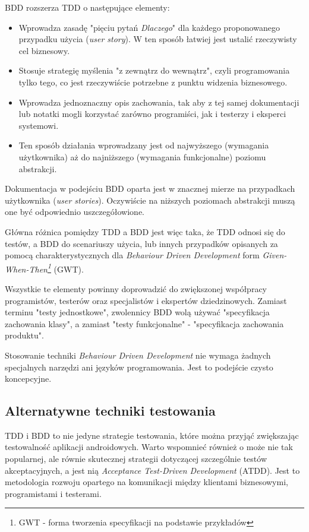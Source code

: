 BDD rozszerza TDD o następujące elementy:
\begin{itemize}
\item
Wprowadza zasadę "pięciu pytań \textit{Dlaczego}" dla każdego proponowanego przypadku użycia (\textit{user story}). W ten sposób łatwiej jest ustalić rzeczywisty cel biznesowy.

\item
Stosuje strategię myślenia "z zewnątrz do wewnątrz", czyli programowania tylko tego, co jest rzeczywiście potrzebne z punktu widzenia biznesowego.

\item
Wprowadza jednoznaczny opis zachowania, tak aby z tej samej dokumentacji lub notatki mogli korzystać zarówno programiści, jak i testerzy i eksperci systemowi.

\item
Ten sposób działania wprowadzany jest od najwyższego (wymagania użytkownika) aż do najniższego (wymagania funkcjonalne) poziomu abstrakcji.

\end{itemize}

Dokumentacja w podejściu BDD oparta jest w znacznej mierze na przypadkach użytkownika (\textit{user stories}). Oczywiście na niższych poziomach abstrakcji muszą one być odpowiednio uszczegółowione.

Główna różnica pomiędzy TDD a BDD jest więc taka, że TDD odnosi się do testów, a BDD do scenariuszy użycia, lub innych przypadków opisanych za pomocą charakterystycznych dla \textit{Behaviour Driven Development} form \textit{Given-When-Then\footnote{GWT - forma tworzenia specyfikacji na podstawie przykładów}} (GWT).

Wszystkie te elementy powinny doprowadzić do zwiększonej współpracy programistów, testerów oraz specjalistów i ekspertów dziedzinowych. Zamiast terminu "testy jednostkowe", zwolennicy BDD wolą używać "specyfikacja zachowania klasy", a zamiast "testy funkcjonalne" - "specyfikacja zachowania produktu".

Stosowanie techniki \textit{Behaviour Driven Development} nie wymaga żadnych specjalnych narzędzi ani języków programowania. Jest to podejście czysto koncepcyjne.\cite{website:agile:guide}

\subsection{Alternatywne techniki testowania}
\label{alternatywne_metody_testowania}
TDD i BDD to nie jedyne strategie testowania, które można przyjąć zwiększając testowalność aplikacji androidowych. Warto wspomnieć również o może nie tak popularnej, ale równie skutecznej strategii dotyczącej szczególnie testów akceptacyjnych, a jest nią \textit{Acceptance Test-Driven Development} (ATDD). Jest to metodologia rozwoju opartego na komunikacji między klientami biznesowymi, programistami i testerami. 


